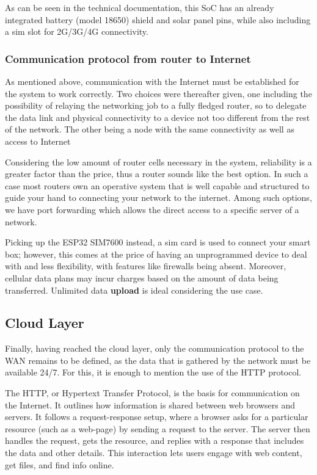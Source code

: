 \documentclass[11pt]{article}
\begin{document}
As can be seen in the technical documentation, this SoC has an already integrated battery (model 18650) shield and solar panel pins, while also including a sim slot for 2G/3G/4G connectivity. 

\subsubsection{Communication protocol from router to Internet}
As mentioned above, communication with the Internet must be established for the system to work correctly. Two choices were thereafter given, one including the possibility of relaying the networking job to a fully fledged router, so to delegate the data link and physical connectivity to a device not too different from the rest of the network. The other being a node with the same connectivity as well as access to Internet \par \vspace{0.5 cm}

Considering the low amount of router cells necessary in the system, reliability is a greater factor than the price, thus a router sounds like the best option. In such a case most routers own an operative system that is well capable and structured to guide your hand to connecting your network to the internet. Among such options, we have port forwarding which allows the direct access to a specific server of a network. \par \vspace{0.5 cm}

Picking up the ESP32 SIM7600 instead, a sim card is used to connect your smart box; however, this comes at the price of having an unprogrammed device to deal with and less flexibility, with features like firewalls being absent. Moreover, cellular data plans may incur charges based on the amount of data being transferred. Unlimited data \textbf{upload} is ideal considering the use case.
\subsection{Cloud Layer}

Finally, having reached the cloud layer, only the communication protocol to the WAN remains to be defined, as the data that is gathered by the network must be available 24/7. For this, it is enough to mention the use of the HTTP protocol. \par \vspace{0.5 cm}

The HTTP, or Hypertext Transfer Protocol, is the basis for communication on the Internet. It outlines how information is shared between web browsers and servers. It follows a request-response setup, where a browser asks for a particular resource (such as a web-page) by sending a request to the server. The server then handles the request, gets the resource, and replies with a response that includes the data and other details. This interaction lets users engage with web content, get files, and find info online.\par \vspace{0.5 cm}
\end{document}
